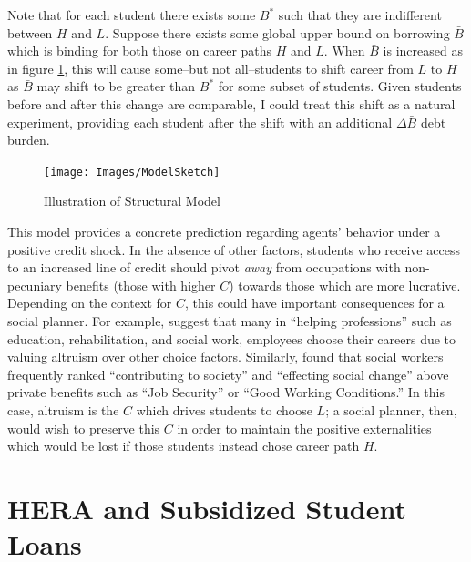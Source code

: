 \documentclass[12pt]{article}
\begin{document}
	Note that for each student there exists some $B^*$ such that they are indifferent between $H$ and $L$. Suppose there exists some global upper bound on borrowing $\bar{B}$ which is binding for both those on career paths $H$ and $L$. When $\bar{B}$ is increased as in figure \ref{struc}, this will cause some--but not all--students to shift career from $L$ to $H$ as $\bar{B}$ may shift to be greater than $B^*$ for some subset of students. Given students before and after this change are comparable, I could treat this shift as a natural experiment, providing each student after the shift with an additional $\Delta\bar{B}$ debt burden. 
	
		
	\begin{figure}
		\centering
		\caption{Illustration of Structural Model}
		\label{struc}
		\texttt{[image: Images/ModelSketch]}
	\end{figure}

	This model provides a concrete prediction regarding agents' behavior under a positive credit shock. In the absence of other factors, students who receive access to an increased line of credit should pivot \emph{away} from occupations with non-pecuniary benefits (those with higher $C$) towards those which are more lucrative. Depending on the context for $C$, this could have important consequences for a social planner. For example, \textcite{benshem1991} suggest that many in ``helping professions'' such as education, rehabilitation, and social work, employees choose their careers due to valuing altruism over other choice factors. Similarly, \textcite{hanson1995} found that social workers frequently ranked ``contributing to society'' and ``effecting social change'' above private benefits such as ``Job Security'' or ``Good Working Conditions.'' In this case, altruism is the $C$ which drives students to choose $L$; a social planner, then, would wish to preserve this $C$ in order to maintain the positive externalities which would be lost if those students instead chose career path $H$.

	\section{HERA and Subsidized Student Loans}
	
\end{document}
